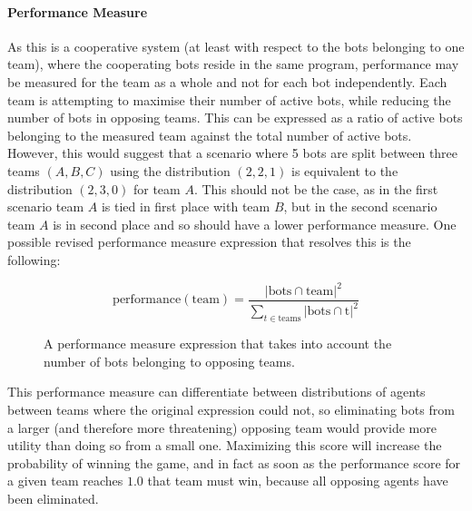 \documentclass[a4paper,10pt]{article}
\begin{document}
\paragraph{Performance Measure}
As this is a cooperative system (at least with respect to the bots belonging to one team), where the cooperating bots reside in the same program, performance may be measured for the team as a whole and not for each bot independently. Each team is attempting to maximise their number of active bots, while reducing the number of bots in opposing teams. This can be expressed as a ratio of active bots belonging to the measured team against the total number of active bots. However, this would suggest that a scenario where 5 bots are split between three teams $(A, B, C)$ using the distribution $(2, 2, 1)$ is equivalent to the distribution $(2, 3, 0)$ for team $A$. This should not be the case, as in the first scenario team $A$ is tied in first place with team $B$, but in the second scenario team $A$ is in second place and so should have a lower performance measure. One possible revised performance measure expression that resolves this is the following:

\begin{figure}[ht]
  \centering
  \begin{minipage}{0.8\textwidth}
    $$
      \text{performance}\left(\text{team}\right) = \frac
        {\left|\text{bots} \cap \text{team}\right|^2}
        {\sum_{t \in \text{teams}} \left|\text{bots} \cap \text{t}\right|^2}
    $$
    \caption{A performance measure expression that takes into account the number of bots belonging to opposing teams.}
  \end{minipage}
\end{figure}

\noindent
This performance measure can differentiate between distributions of agents between teams where the original expression could not, so eliminating bots from a larger (and therefore more threatening) opposing team would provide more utility than doing so from a small one. Maximizing this score will increase the probability of winning the game, and in fact as soon as the performance score for a given team reaches $1.0$ that team must win, because all opposing agents have been eliminated.
\end{document}
